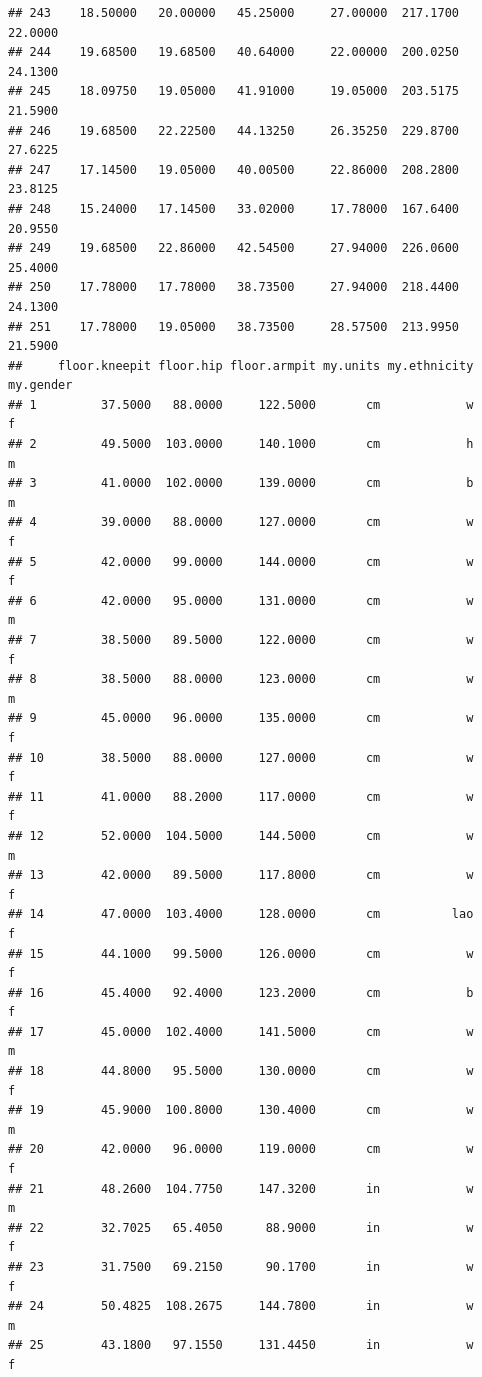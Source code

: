 \documentclass[]{article}
\begin{document}
\begin{verbatim}
## 243    18.50000   20.00000   45.25000     27.00000  217.1700     22.0000
## 244    19.68500   19.68500   40.64000     22.00000  200.0250     24.1300
## 245    18.09750   19.05000   41.91000     19.05000  203.5175     21.5900
## 246    19.68500   22.22500   44.13250     26.35250  229.8700     27.6225
## 247    17.14500   19.05000   40.00500     22.86000  208.2800     23.8125
## 248    15.24000   17.14500   33.02000     17.78000  167.6400     20.9550
## 249    19.68500   22.86000   42.54500     27.94000  226.0600     25.4000
## 250    17.78000   17.78000   38.73500     27.94000  218.4400     24.1300
## 251    17.78000   19.05000   38.73500     28.57500  213.9950     21.5900
##     floor.kneepit floor.hip floor.armpit my.units my.ethnicity my.gender
## 1         37.5000   88.0000     122.5000       cm            w         f
## 2         49.5000  103.0000     140.1000       cm            h         m
## 3         41.0000  102.0000     139.0000       cm            b         m
## 4         39.0000   88.0000     127.0000       cm            w         f
## 5         42.0000   99.0000     144.0000       cm            w         f
## 6         42.0000   95.0000     131.0000       cm            w         m
## 7         38.5000   89.5000     122.0000       cm            w         f
## 8         38.5000   88.0000     123.0000       cm            w         m
## 9         45.0000   96.0000     135.0000       cm            w         f
## 10        38.5000   88.0000     127.0000       cm            w         f
## 11        41.0000   88.2000     117.0000       cm            w         f
## 12        52.0000  104.5000     144.5000       cm            w         m
## 13        42.0000   89.5000     117.8000       cm            w         f
## 14        47.0000  103.4000     128.0000       cm          lao         f
## 15        44.1000   99.5000     126.0000       cm            w         f
## 16        45.4000   92.4000     123.2000       cm            b         f
## 17        45.0000  102.4000     141.5000       cm            w         m
## 18        44.8000   95.5000     130.0000       cm            w         f
## 19        45.9000  100.8000     130.4000       cm            w         m
## 20        42.0000   96.0000     119.0000       cm            w         f
## 21        48.2600  104.7750     147.3200       in            w         m
## 22        32.7025   65.4050      88.9000       in            w         f
## 23        31.7500   69.2150      90.1700       in            w         f
## 24        50.4825  108.2675     144.7800       in            w         m
## 25        43.1800   97.1550     131.4450       in            w         f

\end{verbatim}
\end{document}
